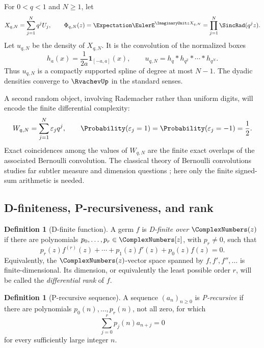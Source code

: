 \documentclass[11pt]{article}
\numberwithin{equation}{section}
\theoremstyle{definition}
\newtheorem{definition}[theorem]{Definition}
\theoremstyle{remark}
\newcommand{\eps}{\varepsilon}
\begin{document}
For $0<q<1$ and $N\ge1$, let
\begin{equation}
 X_{q,N}=\sum_{j=1}^{N}q^jU_j,
 \qquad
 \Phi_{q,N}(z)=\Expectation\EulerE^{\ImaginaryUnit zX_{q,N}}
 =\prod_{j=1}^{N}\SincRad(q^jz).
 \label{eq:finite-product}
\end{equation}
Let $u_{q,N}$ be the density of $X_{q,N}$.  It is the convolution of the
normalized boxes
\begin{equation}
 h_a(x)=\frac{1}{2a}\bm 1_{[-a,a]}(x),\qquad
 u_{q,N}=h_q*h_{q^2}*\cdots*h_{q^N}.
 \label{eq:box-convolution}
\end{equation}
Thus $u_{q,N}$ is a compactly supported spline of degree at most $N-1$.
The dyadic densities converge to $\RvachevUp$ in the standard senses.

A second random object, involving Rademacher rather than uniform digits, will
encode the finite differential complexity:
\begin{equation}
 W_{q,N}=\sum_{j=1}^{N}\eps_jq^j,
 \qquad \Probability(\eps_j=1)=\Probability(\eps_j=-1)=\frac12.
 \label{eq:rademacher-sum}
\end{equation}
Exact coincidences among the values of $W_{q,N}$ are the finite exact overlaps
of the associated Bernoulli convolution.  The classical theory of Bernoulli
convolutions studies far subtler measure and dimension questions
\cite{Solomyak,Hochman}; here only the finite signed-sum arithmetic is needed.

\subsection{D-finiteness, P-recursiveness, and rank}

\begin{definition}[D-finite function]
A germ $f$ is \emph{D-finite over $\ComplexNumbers(z)$} if there are polynomials
$p_0,\ldots,p_r\in\ComplexNumbers[z]$, with $p_r\ne0$, such that
\begin{equation}
 p_r(z)f^{(r)}(z)+\cdots+p_1(z)f'(z)+p_0(z)f(z)=0.
 \label{eq:Dfinite}
\end{equation}
Equivalently, the $\ComplexNumbers(z)$-vector space spanned by
$f,f',f'',\ldots$ is finite-dimensional.  Its dimension, or equivalently the
least possible order $r$, will be called the \emph{differential rank} of $f$.
\end{definition}

\begin{definition}[P-recursive sequence]
A sequence $(a_n)_{n\ge0}$ is \emph{P-recursive} if there are polynomials
$p_0(n),\ldots,p_r(n)$, not all zero, for which
\begin{equation}
 \sum_{j=0}^{r}p_j(n)a_{n+j}=0
 \label{eq:Precursive}
\end{equation}
for every sufficiently large integer $n$.
\end{definition}
\end{document}
